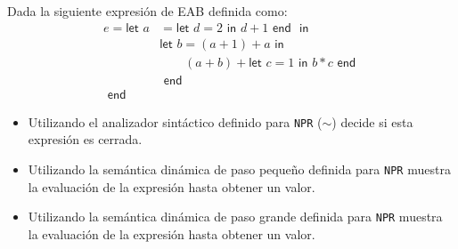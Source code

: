 	\bigskip

    \begin{exercise}
        Dada la siguiente expresión de \textsf{EAB} definida como:
        \begin{align*}
        	e = \textsf{let  }
        		a&= \textsf{let }d = 2 \textsf{ in } d+1 \textsf{ end }
        		\textsf{ in }\\
        		 &\textsf{let }b=(a + 1)+a 
        		 	\textsf{ in } \\
        		 & \qquad(a + b) + \textsf{let }c=1 \textsf{ in } 
        		 						b \ast c 
        		 				\textsf{ end }\\
        		 &\textsf{ end }\\
        	\textsf{ end }&
        \end{align*}

        \begin{itemize}
            \item Utilizando el analizador sintáctico definido para \texttt{NPR} ($\sim$) decide si esta expresión es cerrada.
            \item Utilizando la semántica dinámica de paso pequeño definida para \texttt{NPR} muestra la evaluación de la expresión hasta obtener un valor.
            \item Utilizando la semántica dinámica de paso grande definida para \texttt{NPR} muestra la evaluación de la expresión hasta obtener un valor.
        \end{itemize}
    \end{exercise}
